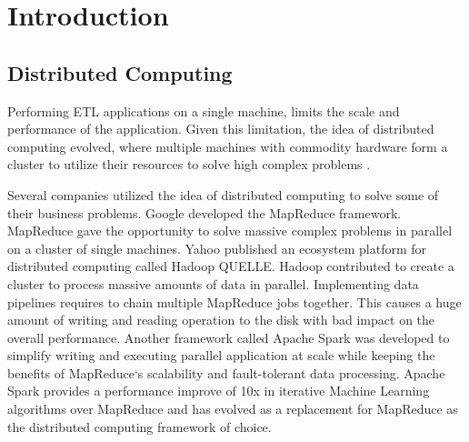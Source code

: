 \chapter{Introduction}
\label{sec:introduction}

\section{Distributed Computing}
Performing ETL applications on a single machine, limits the scale and performance of the application. Given this limitation, the idea of distributed computing evolved, where multiple machines with commodity hardware form a cluster to utilize their resources to solve high complex problems \cite{Ganelin2016Spark}.

Several companies utilized the idea of distributed computing to solve some of their business problems. 
Google developed the MapReduce \cite{Dean2004MapReduce} framework. MapReduce gave the opportunity to solve massive complex problems in parallel on a cluster of single machines.
Yahoo published an ecosystem platform for distributed computing called Hadoop QUELLE. Hadoop contributed to create a cluster to process massive amounts of data in parallel.
Implementing data pipelines requires to chain multiple MapReduce jobs together. This causes a huge amount of writing and reading operation to the disk with bad impact on the overall performance. Another framework called Apache Spark was developed to simplify writing and executing parallel application at scale while keeping the benefits of MapReduce`s scalability and fault-tolerant data processing. Apache Spark provides a performance improve of 10x in iterative Machine Learning algorithms over MapReduce \cite{Zaharia2010Spark} and has evolved as a replacement for MapReduce as the distributed computing framework of choice.


